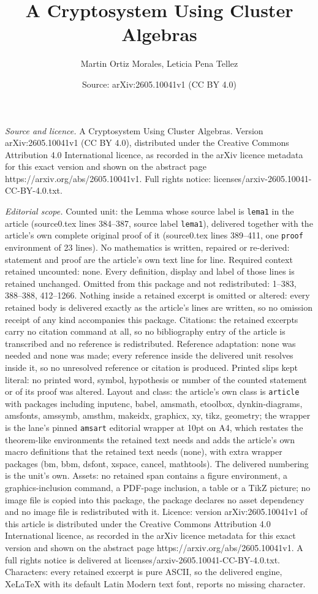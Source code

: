 \documentclass[10pt,a4paper]{amsart}
\title[A Cryptosystem Using Cluster Algebras]{A Cryptosystem Using Cluster Algebras}
\author{Martin Ortiz Morales, Leticia Pena Tellez}
\date{Source: arXiv:2605.10041v1 (CC BY 4.0)}
\begin{document}
\maketitle

\noindent\emph{Source and licence.} A Cryptosystem Using Cluster Algebras. Version arXiv:2605.10041v1 (CC BY 4.0), distributed under the Creative Commons Attribution 4.0 International licence, as recorded in the arXiv licence metadata for this exact version and shown on the abstract page https://arxiv.org/abs/2605.10041v1. Full rights notice: licenses/arxiv-2605.10041-CC-BY-4.0.txt.\par\smallskip

\noindent\textit{Editorial scope.} Counted unit: the Lemma whose source label is \texttt{lema1} in the article (source0.tex lines 384--387, source label \texttt{lema1}), delivered together with the article's own complete original proof of it (source0.tex lines 389--411, one \texttt{proof} environment of 23 lines). No mathematics is written, repaired or re-derived: statement and proof are the article's own text line for line. Required context retained uncounted: none. Every definition, display and label of those lines is retained unchanged. Omitted from this package and not redistributed: 1--383, 388--388, 412--1266. Nothing inside a retained excerpt is omitted or altered: every retained body is delivered exactly as the article's lines are written, so no omission receipt of any kind accompanies this package. Citations: the retained excerpts carry no citation command at all, so no bibliography entry of the article is transcribed and no reference is redistributed. Reference adaptation: none was needed and none was made; every reference inside the delivered unit resolves inside it, so no unresolved reference or citation is produced. Printed slips kept literal: no printed word, symbol, hypothesis or number of the counted statement or of its proof was altered. Layout and class: the article's own class is \texttt{article} with packages including inputenc, babel, amsmath, etoolbox, dynkin-diagrams, amsfonts, amssymb, amsthm, makeidx, graphicx, xy, tikz, geometry; the wrapper is the lane's pinned \texttt{amsart} editorial wrapper at 10pt on A4, which restates the theorem-like environments the retained text needs and adds the article's own macro definitions that the retained text needs (none), with extra wrapper packages (bm, bbm, dsfont, xspace, cancel, mathtools). The delivered numbering is the unit's own. Assets: no retained span contains a figure environment, a graphics-inclusion command, a PDF-page inclusion, a table or a TikZ picture; no image file is copied into this package, the package declares no asset dependency and no image file is redistributed with it. Licence: version arXiv:2605.10041v1 of this article is distributed under the Creative Commons Attribution 4.0 International licence, as recorded in the arXiv licence metadata for this exact version and shown on the abstract page https://arxiv.org/abs/2605.10041v1. A full rights notice is delivered at licenses/arxiv-2605.10041-CC-BY-4.0.txt. Characters: every retained excerpt is pure ASCII, so the delivered engine, XeLaTeX with its default Latin Modern text font, reports no missing character.
\end{document}
